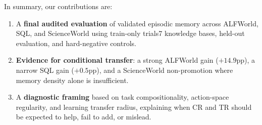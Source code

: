 In summary, our contributions are:
\begin{enumerate}
    \item A \textbf{final audited evaluation} of validated episodic memory across ALFWorld, SQL, and ScienceWorld using train-only trials7 knowledge bases, held-out evaluation, and hard-negative controls.
    \item \textbf{Evidence for conditional transfer}: a strong ALFWorld gain ($+14.9$pp), a narrow SQL gain ($+0.5$pp), and a ScienceWorld non-promotion where memory density alone is insufficient.
    \item A \textbf{diagnostic framing} based on task compositionality, action-space regularity, and learning transfer radius, explaining when CR and TR should be expected to help, fail to add, or mislead.
\end{enumerate}
